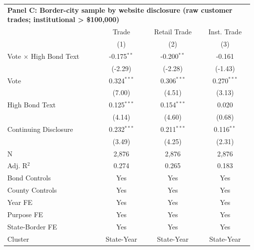 \begingroup
\centering
\begin{tabular*}{\textwidth}{@{\extracolsep{\fill}}lccc}
\multicolumn{5}{l}{\textbf{Panel C: Border-city sample by website disclosure (raw customer trades; institutional > \$100,000)}}\\

\addlinespace
   \toprule
                                 & Trade         & Retail Trade  & Inst. Trade\\  
                                 & (1)           & (2)           & (3)\\  
   \midrule 
   Vote $\times$ High Bond Text  & -0.175$^{**}$ & -0.200$^{**}$ & -0.161\\   
                                 & (-2.29)      & (-2.28)      & (-1.43)\\   
   Vote                          & 0.324$^{***}$ & 0.306$^{***}$ & 0.270$^{***}$\\   
                                 & (7.00)       & (4.51)       & (3.13)\\   
   High Bond Text                & 0.125$^{***}$ & 0.154$^{***}$ & 0.020\\   
                                 & (4.14)       & (4.60)       & (0.68)\\   
   Continuing Disclosure         & 0.232$^{***}$ & 0.211$^{***}$ & 0.116$^{**}$\\   
                                 & (3.49)       & (4.25)       & (2.31)\\   
   \hline
   N                  & 2,876         & 2,876         & 2,876\\  
   Adj. R$^2$                & 0.274         & 0.265         & 0.183\\  
   Bond Controls                 & Yes           & Yes           & Yes\\  
   County Controls               & Yes           & Yes           & Yes\\  
   Year FE                       & Yes           & Yes           & Yes\\  
   Purpose FE                    & Yes           & Yes           & Yes\\  
   State-Border FE               & Yes           & Yes           & Yes\\  
   Cluster              & State-Year & State-Year & State-Year\\  
   \bottomrule
\end{tabular*}
\par\endgroup
